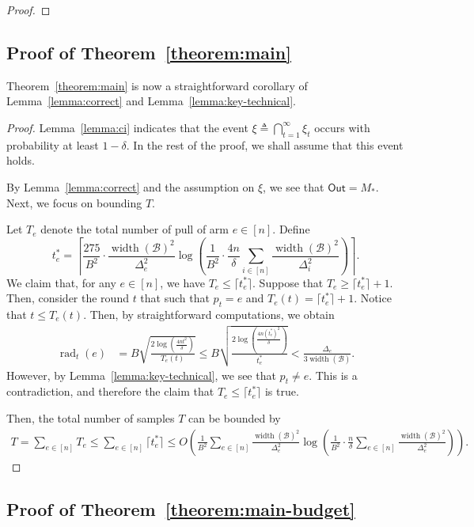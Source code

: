 \documentclass{article}
\newcommand{\B}{\mathcal B}
\DeclareMathOperator{\rank}{width}
\DeclareMathOperator{\rad}{rad}
\newcommand{\out}{\mathsf{Out}}
\begin{document}
\begin{spacing}{1.1}
\begin{proof}
\end{proof}


\subsection{Proof of Theorem~\ref{theorem:main}}

Theorem~\ref{theorem:main} is now a straightforward corollary of Lemma~\ref{lemma:correct} and Lemma~\ref{lemma:key-technical}.
\begin{proof}
Lemma~\ref{lemma:ci} indicates that the event $\xi \triangleq \bigcap_{t=1}^\infty \xi_t$ occurs with probability at least $1-\delta$.
In the rest of the proof, we shall assume that this event holds.

By Lemma~\ref{lemma:correct} and the assumption on $\xi$, we see that $\out=M_*$.
Next, we focus on bounding $T$.


Let $T_e$ denote the total number of pull of arm $e\in [n]$.
Define 
$$
t_e^* = \left\lceil\frac{275}{B^2}\cdot\frac{\rank(\B)^2}{\Delta_e^2}\log\left(\frac{1}{B^2}\cdot\frac{4n}{\delta}\sum_{i\in[n]}\frac{\rank(\B)^2}{\Delta_i^2}\right)\right\rceil.
$$
We claim that, for any $e \in [n]$, we have $T_e \le \lceil t_e^* \rceil$.
Suppose that $T_e \ge \lceil t_e^* \rceil+1$.
Then, consider the round $t$ that such that $p_t=e$ and $T_e(t) =  \lceil t_e^* \rceil+1$.
Notice that $t \le T_e(t)$.
Then, by straightforward computations, we obtain
\begin{align*}
\rad_t(e) &=   B\sqrt{\frac{2\log\left(\frac{4n t^2}\delta\right)}{T_e(t)}} \le
 B\sqrt{\frac{2\log\left(\frac{4n (t_e^*)^2}\delta\right)}{t_e^*}} <  \frac{\Delta_e}{3\rank(\B)}. 	
\end{align*}
However, by Lemma~\ref{lemma:key-technical}, we see that $p_t\not=e$. This is a contradiction, and therefore the claim that $T_e \le \lceil t_e^* \rceil$ is true.

Then, the total number of samples $T$ can be bounded by
\begin{align*}
T = \sum_{e\in [n]} T_e \le \sum_{e\in [n]} \lceil t_e^* \rceil \le 
O\left(\frac{1}{B^2}\sum_{e\in [n]} \frac{\rank(\B)^2}{\Delta_e^2} \log\left(\frac{1}{B^2}\cdot \frac{n}{\delta} \sum_{e\in[n]}\frac{\rank(\B)^2}{\Delta_e^2} \right)\right).
\end{align*}

\end{proof}


\subsection{Proof of Theorem~\ref{theorem:main-budget}}


\end{spacing}
\end{document}
